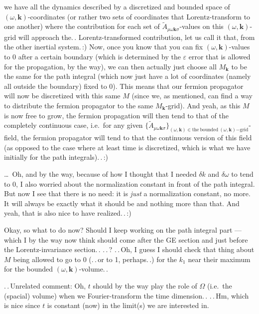 \documentclass{report}
\begin{document}
we have all the dynamics described by a discretized and bounded space of $(\omega, \boldsymbol{k})$-coordinates (or rather two sets of coordinates that Lorentz-transform to one another) where the contribution for each set of $\tilde A_{\mu\omega\boldsymbol{k}\sigma}$-values on this $(\omega, \boldsymbol{k})$-grid will approach the.\,. Lorentz-transformed contribution, let us call it that, from the other inertial system.\,:) Now, once you know that you can fix $(\omega, \boldsymbol{k})$-values to 0 after a certain boundary (which is determined by the $\varepsilon$ error that is allowed for the propagation, by the way), we can then actually just choose all $M_{\boldsymbol{k}}$ to be the same for the path integral (which now just have a lot of coordinates (namely all outside the boundary) fixed to 0). This means that our fermion propagator will now be discretized with this same $M$ (since we, as mentioned, can find a way to distribute the fermion propagator to the same $M_{\boldsymbol{k}}$-grid). And yeah, as this $M$ is now free to grow, the fermion propagation will then tend to that of the completely continuous case, i.e.\ for any given $\{\tilde A_{\mu\omega\boldsymbol{k}\sigma}\}_{(\omega, \boldsymbol{k})\in \mathrm{the\ bounded\ }(\omega, \boldsymbol{k})\mathrm{-grid}}$-field, the fermion propagator will tend to that the continuous version of this field (as opposed to the case where at least time is discretized, which is what we have initially for the path integrals).\,.\,:) %

\ldots\ Oh, and by the way, because of how I thought that I needed $\delta k$ and $\delta \omega$ to tend to 0, I also worried about the normalization constant in front of the path integral. But now I see that there is no need: it is \emph{just} a normalization constant, no more. It will always be exactly what it should be and nothing more than that. And yeah, that is also nice to have realized.\,.\,:)

Okay, so what to do now? Should I keep working on the path integral part --- which I by the way now think should come after the GE section and just before the Lorentz-invariance section.\,. .\,.\,? .\,.\,Oh, I guess I should check that thing about $M$ being allowed to go to 0 (.\,.\,or to 1, perhaps.\,.) for the $k_1$ near their maximum for the bounded $(\omega, \boldsymbol{k})$-volume.\,. 

.\,.\,Unrelated comment: Oh, $t$ should by the way play the role of $\Omega$ (i.e.\ the (spacial) volume) when we Fourier-transform the time dimension.\,. .\,.\,Hm, which is nice since $t$ is constant (now) in the limit(s) we are interested in.
\end{document}
